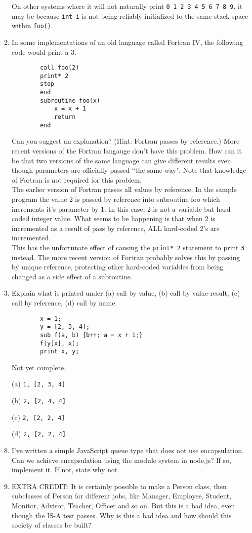 \documentclass{article}
\begin{document}
\begin{enumerate}
    On other systems where it will not naturally print \texttt{0 1 2 3 4 5 6 7 8 9}, it may be because \texttt{int i} is not being reliably initialized to the same stack space within \texttt{foo()}.
    
    \setcounter{enumi}{7}
    \pagebreak
    \item In some implementations of an old language called Fortran IV, the following code would print a 3. 
    \begin{verbatim} 
        call foo(2)
        print* 2
        stop
        end
        subroutine foo(x)
            x = x + 1
            return
        end
    \end{verbatim}
    Can you suggest an explanation? (Hint: Fortran passes by reference.) More recent versions of the Fortran langauge don't have this problem. How can it be that two versions of the same language can give different results even though parameters are officially passed ``the same way". Note that knowledge of Fortran is not required for this problem.\\[.25in]
    The earlier version of Fortran passes all values by reference. In the sample program the value 2 is passed by reference into subroutine foo which increments it's parameter by 1. In this case, 2 is not a variable but hard-coded integer value. What seems to be happening is that when 2 is incremented as a result of pass by reference, ALL hard-coded 2's are incremented. \\[.1in]
    This has the unfortunate effect of causing the \texttt{print* 2} statement to print \texttt{3} instead. The more recent version of Fortran probably solves this by passing by unique reference, protecting other hard-coded variables from being changed as a side effect of a subroutine.
    \setcounter{enumi}{9}
    \pagebreak
    \item Explain what is printed under (a) call by value, (b) call by value-result, (c) call by reference, (d) call by name.
    \begin{verbatim}
        x = 1;
        y = [2, 3, 4];
        sub f(a, b) {b++; a = x + 1;}
        f(y[x], x);
        print x, y;
    \end{verbatim}
    Not yet complete.
        \item[(a)]
        \texttt{1, [2, 3, 4]}
        \item[(b)]
        \texttt{2, [2, 4, 4]}
        \item[(c)]
        \texttt{2, [2, 2, 4]}
        \item[(d)]
        \texttt{2, [2, 2, 4]}
    \pagebreak
    \item I've written a simple JavaScript queue type that does not use encapsulation. Can we achieve encapsulation using the module system in node.js? If so, implement it. If not, state why not.
    \pagebreak
    \item EXTRA CREDIT: It is certainly possible to make a Person class, then subclasses of Person for different jobs, like Manager, Employee, Student, Monitor, Advisor, Teacher, Officer and so on. But this is a bad idea, even though the IS-A test passes. Why is this a bad idea and how should this society of classes be built? \\[.1in]


\end{enumerate}
\end{document}
